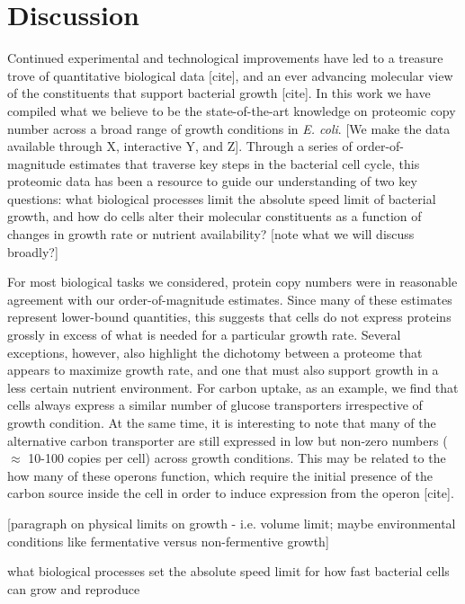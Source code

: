 \section{Discussion}
Continued experimental and technological improvements have led to a treasure
trove of quantitative biological data [cite], and an ever advancing molecular
view of the constituents that support bacterial growth [cite]. In this work we
have compiled what we believe to be the state-of-the-art knowledge on proteomic
copy number across a broad range of growth conditions in \textit{E. coli}. [We
make the data available through X, interactive Y, and Z]. Through a series of
order-of-magnitude estimates that traverse key steps in the bacterial cell
cycle, this proteomic data has been a resource to guide our understanding of two
key questions: what biological processes limit the absolute speed limit of
bacterial growth, and how do cells alter their  molecular constituents as a
function of changes in growth rate or nutrient availability?
[note what we will discuss broadly?]

For most biological tasks we considered, protein copy numbers were in reasonable
agreement with our order-of-magnitude estimates. Since many of these estimates
represent lower-bound quantities, this suggests that cells do not express
proteins grossly in excess of what is needed for a particular growth rate.
Several exceptions, however, also highlight the dichotomy between a proteome
that appears to maximize growth rate, and one that must also support growth in a
less certain nutrient environment. For carbon uptake, as an example, we find
that cells always express a similar number of glucose transporters irrespective
of growth condition. At the same time, it is interesting to note that many of
the alternative carbon transporter are still expressed in low but non-zero
numbers ($\approx$ 10-100 copies per cell) across growth conditions. This may be
related to the how many of these operons function, which require the initial
presence of the carbon source inside the cell in order to induce expression from
the operon [cite].

[paragraph on physical limits on growth - i.e. volume limit; maybe environmental
conditions like fermentative versus non-fermentive growth]

what biological
processes set the absolute speed limit for how fast bacterial cells can grow and
reproduce

